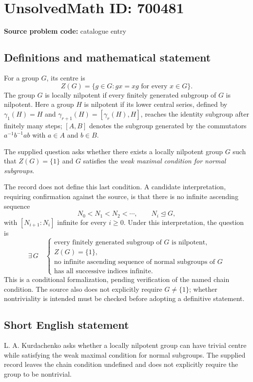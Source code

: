 \documentclass[11pt]{article}
\begin{document}
\section*{UnsolvedMath ID: 700481}
\textbf{Source problem code:} catalogue entry
\subsection{Definitions and mathematical statement}
For a group \(G\), its centre is
\[
Z(G)=\{g\in G: gx=xg\text{ for every }x\in G\}.
\]
The group \(G\) is locally nilpotent if every finitely generated subgroup of \(G\) is nilpotent. Here a group \(H\) is nilpotent if its lower central series, defined by \(\gamma_1(H)=H\) and \(\gamma_{r+1}(H)=[\gamma_r(H),H]\), reaches the identity subgroup after finitely many steps; \([A,B]\) denotes the subgroup generated by the commutators \(a^{-1}b^{-1}ab\) with \(a\in A\) and \(b\in B\).

The supplied question asks whether there exists a locally nilpotent group \(G\) such that \(Z(G)=\{1\}\) and \(G\) satisfies the \emph{weak maximal condition for normal subgroups}.

The record does not define this last condition. A candidate interpretation, requiring confirmation against the source, is that there is no infinite ascending sequence
\[
N_0<N_1<N_2<\cdots,\qquad N_i\trianglelefteq G,
\]
with \([N_{i+1}:N_i]\) infinite for every \(i\geq 0\). Under this interpretation, the question is
\[
\exists\,G\quad
\begin{cases}
\text{every finitely generated subgroup of }G\text{ is nilpotent},\\
Z(G)=\{1\},\\
\text{no infinite ascending sequence of normal subgroups of }G\\
\text{has all successive indices infinite}.
\end{cases}
\]
This is a conditional formalization, pending verification of the named chain condition. The source also does not explicitly require \(G\neq\{1\}\); whether nontriviality is intended must be checked before adopting a definitive statement.
\subsection{Short English statement}
L. A. Kurdachenko asks whether a locally nilpotent group can have trivial centre while satisfying the weak maximal condition for normal subgroups. The supplied record leaves the chain condition undefined and does not explicitly require the group to be nontrivial.
\end{document}
